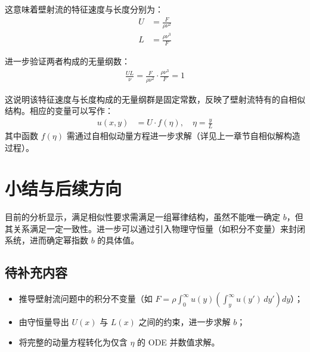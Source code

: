 这意味着壁射流的特征速度与长度分别为：
\begin{align}
    U &= \frac{F}{\rho \nu^{2}} \\
    L &= \frac{\rho \nu^{3}}{F}
\end{align}

进一步验证两者构成的无量纲数：
\begin{align}
    \frac{UL}{\nu} = \frac{F}{\rho \nu^{2}} \cdot \frac{\rho \nu^{3}}{F} = 1
\end{align}

这说明该特征速度与长度构成的无量纲群是固定常数，反映了壁射流特有的自相似结构。相应的变量可以写作：
\begin{align}
    u(x,y) &= U \cdot f(\eta), \quad \eta = \frac{y}{L}
\end{align}
其中函数 $f(\eta)$ 需通过自相似动量方程进一步求解（详见上一章节自相似解构造过程）。



\section{小结与后续方向}
目前的分析显示，满足相似性要求需满足一组幂律结构，虽然不能唯一确定 $b$，但其关系满足一定一致性。进一步可以通过引入物理守恒量（如积分不变量）来封闭系统，进而确定幂指数 $b$ 的具体值。

\subsection*{待补充内容}
\begin{itemize}
    \item 推导壁射流问题中的积分不变量（如 $F = \rho \int_0^\infty u(y)\left( \int_y^\infty u(y') \, dy' \right) dy$）；
    \item 由守恒量导出 $U(x)$ 与 $L(x)$ 之间的约束，进一步求解 $b$；
    \item 将完整的动量方程转化为仅含 $\eta$ 的 ODE 并数值求解。
\end{itemize}

